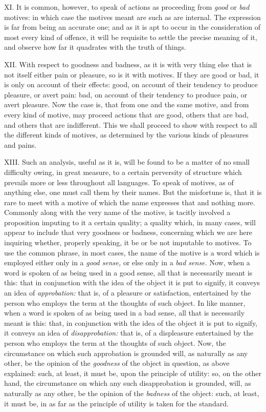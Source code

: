 \documentclass[12pt]{report}
\begin{document}
XI. It is common, however, to speak of actions as proceeding from
\emph{good} or \emph{bad} motives: in which case the motives meant are
such as are internal. The expression is far from being an accurate one;
and as it is apt to occur in the consideration of most every kind of
offence, it will be requisite to settle the precise meaning of it, and
observe how far it quadrates with the truth of things.

XII. With respect to goodness and badness, as it is with very thing else
that is not itself either pain or pleasure, so is it with motives. If
they are good or bad, it is only on account of their effects: good, on
account of their tendency to produce pleasure, or avert pain: bad, on
account of their tendency to produce pain, or avert pleasure. Now the
case is, that from one and the same motive, and from every kind of
motive, may proceed actions that are good, others that are bad, and
others that are indifferent. This we shall proceed to show with respect
to all the different kinds of motives, as determined by the various
kinds of pleasures and pains.

XIII. Such an analysis, useful as it is, will be found to be a matter of
no small difficulty owing, in great measure, to a certain perversity of
structure which prevails more or less throughout all languages. To speak
of motives, as of anything else, one must call them by their names. But
the misfortune is, that it is rare to meet with a motive of which the
name expresses that and nothing more. Commonly along with the very name
of the motive, is tacitly involved a proposition imputing to it a
certain quality; a quality which, in many cases, will appear to include
that very goodness or badness, concerning which we are here inquiring
whether, properly speaking, it be or be not imputable to motives. To use
the common phrase, in most cases, the name of the motive is a word which
is employed either only in a \emph{good sense,} or else only in a
\emph{bad sense.} Now, when a word is spoken of as being used in a good
sense, all that is necessarily meant is this: that in conjunction with
the idea of the object it is put to signify, it conveys an idea of
\emph{approbation:} that is, of a pleasure or satisfaction, entertained
by the person who employs the term at the thoughts of such object. In
like manner, when a word is spoken of as being used in a bad sense, all
that is necessarily meant is this: that, in conjunction with the idea of
the object it is put to signify, it conveys an idea of
\emph{disapprobation:} that is, of a displeasure entertained by the
person who employs the term at the thoughts of such object. Now, the
circumstance on which such approbation is grounded will, as naturally as
any other, be the opinion of the \emph{goodness} of the object in
question, as above explained: such, at least, it must be, upon the
principle of utility: so, on the other hand, the circumstance on which
any such disapprobation is grounded, will, as naturally as any other, be
the opinion of the \emph{badness} of the object: such, at least, it must
be, in as far as the principle of utility is taken for the standard.
\end{document}
